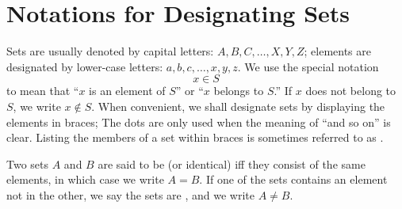 \section{Notations for Designating Sets}\label{sec:1.2.2}

\begin{defn}\label{defn:1.2.2}
  Sets are usually denoted by capital letters:
  \(A, B, C, \dots, X, Y, Z\);
  elements are designated by lower-case letters:
  \(a, b, c, \dots, x, y, z\).
  We use the special notation
  \[
    x \in S
  \]
  to mean that ``\(x\) is an element of \(S\)'' or ``\(x\) belongs to \(S\).''
  If \(x\) does not belong to \(S\), we write \(x \notin S\).
  When convenient, we shall designate sets by displaying the elements in braces;
  The dots are only used when the meaning of ``and so on'' is clear.
  Listing the members of a set within braces is sometimes referred to as \textbf{}.
\end{defn}

\begin{defn}\label{defn:1.2.3}
  Two sets \(A\) and \(B\) are said to be \textbf{} (or identical) iff they consist of the same elements, in which case we write \(A = B\).
  If one of the sets contains an element not in the other, we say the sets are \textbf{}, and we write \(A \neq B\).
\end{defn}
